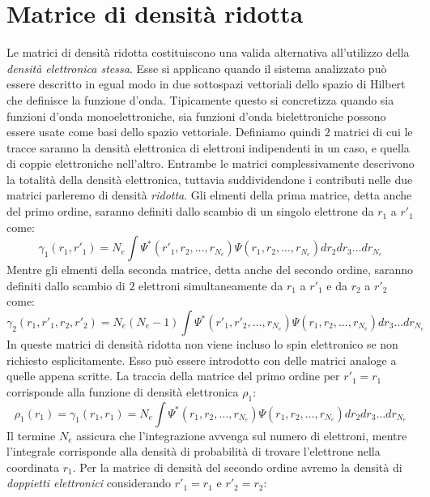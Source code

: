 \documentclass[oneside]{amsbook}
\numberwithin{section}{chapter}
\numberwithin{equation}{section}
\numberwithin{figure}{section}
\begin{document}
\section{Matrice di densità ridotta}\label{densr}
Le matrici di densità ridotta costituiscono una valida alternativa all'utilizzo della \emph{densità elettronica stessa}. Esse si applicano quando il sistema analizzato può essere descritto in egual modo in due sottospazi vettoriali dello spazio di Hilbert che definisce la funzione d'onda. Tipicamente questo si concretizza quando sia funzioni d'onda monoelettroniche, sia funzioni d'onda bielettroniche possono essere usate come basi dello spazio vettoriale.
Definiamo quindi $2$ matrici di cui le tracce saranno la densità elettronica di elettroni indipendenti in un caso, e quella di coppie elettroniche nell'altro. Entrambe le matrici complessivamente descrivono la totalità della densità elettronica, tuttavia suddividendone i contributi nelle due matrici parleremo di densità \emph{ridotta}.
Gli elmenti della prima matrice, detta anche del primo ordine, saranno definiti dallo scambio di un singolo elettrone da $r_1$ a $r'_1$ come:
\begin{equation}
\gamma_1(r_1,r'_1)= N_e \int \Psi^*( r'_1, r_2, \ldots, r_{N_e})\Psi( r_1, r_2, \ldots, r_{N_e}) dr_2 dr_3 \ldots dr_{N_e}
\end{equation}
Mentre gli elmenti della seconda matrice, detta anche del secondo ordine, saranno definiti dallo scambio di $2$ elettroni simultaneamente da $r_1$ a $r'_1$  e da $r_2$ a $r'_2$ come:
\begin{equation}
\gamma_2(r_1,r'_1,r_2,r'_2)= N_e(N_e-1) \int \Psi^*( r'_1, r'_2, \ldots, r_{N_e})\Psi( r_1, r_2, \ldots, r_{N_e})  dr_3 \ldots dr_{N_e}
\end{equation}
In queste matrici di densità ridotta non viene incluso lo spin elettronico se non richiesto esplicitamente. Esso può essere introdotto con delle matrici analoge a quelle appena scritte.
La traccia della matrice del primo ordine per $r'_1=r_1$ corrisponde alla funzione di densità elettronica $\rho_1$:
\begin{equation}
\rho_1(r_1) = \gamma_1(r_1,r_1)= N_e \int \Psi^*( r_1, r_2, \ldots, r_{N_e})\Psi( r_1, r_2, \ldots, r_{N_e}) dr_2 dr_3 \ldots dr_{N_e}
\end{equation}
Il termine $N_e$ assicura che l'integrazione avvenga sul numero di elettroni, mentre l'integrale corrisponde alla densità di probabilità di trovare l'elettrone nella coordinata $r_1$.
Per la matrice di densità del secondo ordine avremo la densità di \emph{doppietti elettronici} considerando $r'_1=r_1$ e $r'_2=r_2$:
\end{document}
